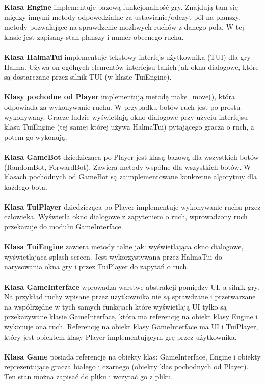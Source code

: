 \documentclass[12pt, titlepage]{article}
\begin{document}
\pagebreak
\noindent
\textbf{Klasa Engine} implementuje bazową funkcjonalność
gry. Znajdują tam się między innymi metody
odpowedzialne za ustawianie/odczyt pól na planszy,
metody pozwalające na sprawdzenie możliwych ruchów
z danego pola. W tej klasie jest zapisany stan planszy
i numer obecnego ruchu.
\\~\\
\textbf{Klasa HalmaTui} implementuje tekstowy interfejs
użytkownika (TUI) dla gry Halma. Używa on ogólnych
elementów interfejsu takich jak okna dialogowe, które
są dostarczane przez silnik TUI (w klasie TuiEngine).
\\~\\
\textbf{Klasy pochodne od Player} implementują metodę
make\_move(), która odpowiada za wykonywanie ruchu. W
przypadku botów ruch jest po prostu wykonywany. Gracze-ludzie
wyświetlają okno dialogowe
przy użyciu interfejsu klasu TuiEngine (tej samej której używa
HalmaTui) pytającego gracza o ruch, a potem go wykonują.
\\~\\
\textbf{Klasa GameBot} dziedzicząca po Player jest klasą
bazową dla wszystkich botów (RandomBot, ForwardBot). Zawiera
metody wspólne dla wszystkich botów. W klasach pochodnych od
GameBot są zaimplementowane konkretne algorytmy dla każdego bota.
\\~\\
\textbf{Klasa TuiPlayer} dziedzicząca po Player implementuje
wykonywanie ruchu przez człowieka. Wyświetla okno dialogowe
z zapyteniem o ruch, wprowadzony ruch przekazuje do modułu
GameInterface.
\\~\\
\textbf{Klasa TuiEngine} zawiera metody
takie jak: wyświetlająca okno dialogowe, wyświetlająca splash screen.
Jest wykorzystywana przez HalmaTui do narysowania okna gry i
przez TuiPlayer do zapytań o ruch.
\\~\\
\textbf{Klasa GameInterface} wprowadza warstwę
abstrakcji pomiędzy UI, a silnik gry. Na przykład ruchy wpisane
przez użytkownika nie są sprawdzane i przetwarzane na współrzędne
w tych samych funkcjach które wyświetlają UI tylko są przekazywane
klasie GameInterface, która ma referencję na obiekt klasy Engine
i wykonuje
ona ruch. Referencję na obiekt klasy GameInterface ma UI i TuiPlayer,
który jest obiektem klasy Player implementującym grę przez użytkownika.
\\~\\
\textbf{Klasa Game} posiada referencję na obiekty klas: GameInterface, Engine i
obiekty reprezentujące gracza białego i czarnego (obiekty klas
pochodnych od Player). Ten stan można zapisać do pliku i wczytać
go z pliku.
\end{document}

